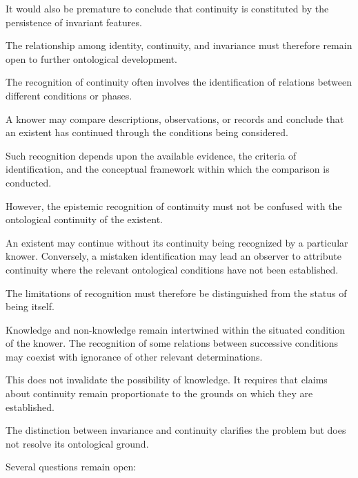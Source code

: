 It would also be premature to
conclude that continuity is
constituted by the persistence
of invariant features.

The relationship among identity,
continuity, and invariance must
therefore remain open to further
ontological development.


The recognition of continuity
often involves the identification
of relations between different
conditions or phases.

A knower may compare descriptions,
observations, or records and
conclude that an existent has
continued through the conditions
being considered.

Such recognition depends upon
the available evidence, the
criteria of identification,
and the conceptual framework
within which the comparison
is conducted.

However, the epistemic recognition
of continuity must not be confused
with the ontological continuity
of the existent.

An existent may continue without
its continuity being recognized
by a particular knower. Conversely,
a mistaken identification may
lead an observer to attribute
continuity where the relevant
ontological conditions have not
been established.

The limitations of recognition
must therefore be distinguished
from the status of being itself.

Knowledge and non-knowledge remain
intertwined within the situated
condition of the knower. The
recognition of some relations
between successive conditions
may coexist with ignorance of
other relevant determinations.

This does not invalidate the
possibility of knowledge. It
requires that claims about
continuity remain proportionate
to the grounds on which they
are established.


The distinction between invariance
and continuity clarifies the
problem but does not resolve
its ontological ground.

Several questions remain open:

